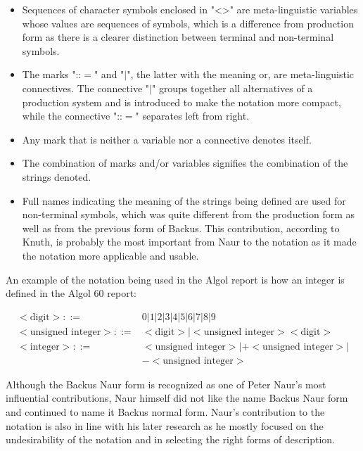 \documentclass{article}
\begin{document}
\begin{itemize}
	\item Sequences of character symbols enclosed in "<>" are meta-linguistic variables whose values are sequences of symbols, which is a difference from production form as there is a clearer distinction between terminal and non-terminal symbols.
	\item The marks "::$=$" and "$|$", the latter with the meaning or, are meta-linguistic connectives. The connective "$|$" groups together all alternatives of a production system and is introduced to make the notation more compact, while the connective "::$=$" separates left from right.
	\item Any mark that is neither a variable nor a connective denotes itself.
	\item The combination of marks and/or variables signifies the combination of the strings denoted.
	\item Full names indicating the meaning of the strings being defined are used for non-terminal symbols, which was quite different from the production form as well as from the previous form of Backus. This contribution, according to Knuth, is probably the most important from Naur to the notation as it made the notation more applicable and usable.
\end{itemize}

An example of the notation being used in the Algol report is how an integer is defined in the Algol 60 report:

\begin{equation} \label{eq3}
	\begin{split}
	<\text{digit}> ::=&0|1|2|3|4|5|6|7|8|9 \\
	<\text{unsigned integer}> ::=&<\text{digit}>|<\text{unsigned integer}><\text{digit}> \\
	<\text{integer}> ::=&<\text{unsigned integer}>|+<\text{unsigned integer}>|\\&-<\text{unsigned integer}>
	\end{split}
\end{equation}

Although the Backus Naur form is recognized as one of Peter Naur's most influential contributions, Naur himself did not like the name Backus Naur form and continued to name it Backus normal form. Naur's contribution to the notation is also in line with his later research as he mostly focused on the undesirability of the notation and in selecting the right forms of description. 
\end{document}

